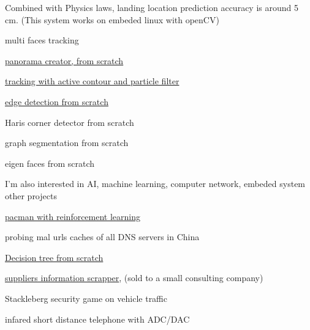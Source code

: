 \begin{cventries}
{\begin{cvitems}
{{        Combined with Physics laws, landing location prediction accuracy is around 5 cm. 
        (This system works on embeded linux with openCV)}}
        \item {multi faces tracking}
        \item {\href{https://github.com/yihui-he/panorama}{panorama creator, from scratch}\\
        \color{lightgray}{
        First, to reorder shuffled images, I match SIFT features pairs between each couple of input images. Naive bayes is employed to determine order 
        from multi proposals. Then cylindrical coordinate and RANSAC are used to estimate transformation. Finally, merge image using $\alpha$ blending.}}
        \item {\href{https://github.com/yihui-he/lip-tracking-with-snake-active-contour-and-particle-filter}
        {tracking with active contour and particle filter}}
        \item {\href{https://github.com/yihui-he/Edge-detection-with-zero-crossing}{edge detection from scratch}}
        \item {Haris corner detector from scratch}
        \item {graph segmentation from scratch}
        \item {eigen faces from scratch}
      \end{cvitems}
    }


  \cventry
    {I'm also interested in AI, machine learning, computer network, embeded system} %
    {other projects} %
    { } %
    { } %
    {
      \begin{cvitems} %
        \item {\href{https://github.com/yihui-he/AI-CS_188}{pacman with reinforcement learning}}
        \item {probing  mal urls caches of all DNS servers in China\href{https://github.com/yihui-he/DNS_query_Cpp}{}}
	\item {\href{https://github.com/yihui-he/Decision-tree}{Decision tree from scratch}}
        \item {\href{https://github.com/yihui-he/Alibaba-supplier-info-Scrapper}{suppliers information scrapper}, (sold to a small consulting company)}
        \item {Stackleberg security game on vehicle traffic}
        \item {infared short distance telephone with ADC/DAC}
      \end{cvitems}
    }

\end{cventries}
